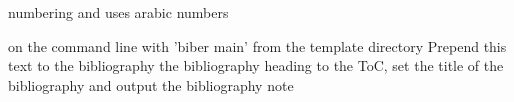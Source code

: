 \documentclass[
  fontsize=10pt,
  twoside=true,
  numbers=noenddot,
  overfullrule=false,
]{kaobook}
\begin{document}

\etocstandarddisplaystyle %
\etocstandardlines %
\tableofcontents

\mainmatter %
numbering and uses arabic numbers





\setcounter{chapter}{0}
\renewcommand{\thechapter}{\Alph{chapter}}



\backmatter
on the command line with 'biber main' from the template directory
Prepend this text to the bibliography
\printbibliography[heading=bibintoc, title=Bibliography, prenote=bibnote] %
the bibliography heading to the ToC, set the title of the bibliography and
output the bibliography note
\end{document}
